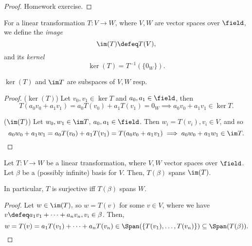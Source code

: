 \begin{proof}
    Homework exercise.
\end{proof}

\begin{definition}
    For a linear transformation $T: V \to W$, where $V, W$ are vector spaces over $\field$, we define the \emph{image} \[
        \im (T)  \defeq T(V),
    \]
    and its \emph{kernel} \[
    \ker (T) = T^{-1}(\{0_W\}).
    \]
\end{definition}

\begin{proposition}
    $\ker (T)$ and $\im T$ are subspaces of $V, W$ resp.
\end{proposition}

\begin{proof}
 \noindent($\ker (T)$) Let $v_0, v_1 \in \ker T$ and $a_0, a_1 \in \field$, then \[
 T(a_0 v_0  + a_1 v_1) = a_0T(v_0) + a_1T(v_1) = 0_W \implies a_0v_0 + a_1v_1 \in \ker T.   
 \]

\noindent ($\im (T)$) Let $w_0, w_1 \in \im T$, $a_0, a_1 \in \field$. Then $w_i = T(v_i), v_i \in V$, and so \[
a_0 w_0 + a_1 w_1 = a_0 T(v_0) + a_1T(v_1) = T(a_0 v_0 + a_1 v_1) \implies a_0 w_0 + a_1 w_1 \in \im T.    
\]
\end{proof}

\begin{proposition}
    Let $T: V \to W$ be a linear transformation, where $V, W$ vector spaces over $\field$. Let $\beta$ be a (possibly infinite) basis for $V$. Then, $T (\beta)$ spans $\im (T)$. 
    
    In particular, $T$ is surjective iff $T(\beta)$ spans $W$.
\end{proposition}

\begin{proof}
    Let $w \in \im(T),$ so $w = T(v)$ for some $v \in V$, where we have $v\defeq a_1 v_1 + \cdots + a_n v_n, v_i \in \beta$. Then, \[
    w = T(v) = a_1 T(v_1) + \cdots + a_n T(v_n) \in \Span(\{T(v_1), \dots, T(v_n)\}) \subseteq \Span(T(\beta)).
    \]

\end{proof}